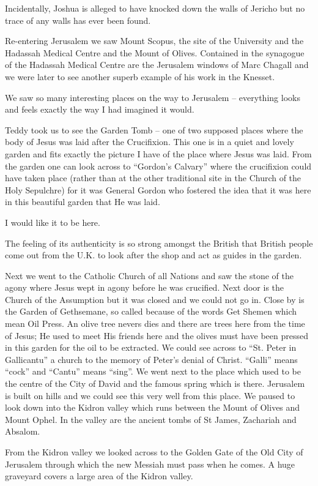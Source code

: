 Incidentally, Joshua is alleged to have knocked down the walls of
Jericho but no trace of any walls has ever been found.

Re-entering Jerusalem we saw Mount Scopus, the site of the University
and the Hadassah Medical Centre and the Mount of Olives. Contained in
the synagogue of the Hadassah Medical Centre are the Jerusalem windows
of Marc Chagall and we were later to see another superb example of his
work in the Knesset.

We saw so many interesting places on the way to Jerusalem --
everything looks and feels exactly the way I had imagined it would.

Teddy took us to see the Garden Tomb -- one of two supposed places
where the body of Jesus was laid after the Crucifixion. This one is in
a quiet and lovely garden and fits exactly the picture I have of the
place where Jesus was laid. From the garden one can look across to
``Gordon's Calvary'' where the crucifixion could have taken place
(rather than at the other traditional site in the Church of the Holy
Sepulchre) for it was General Gordon who fostered the idea that it was
here in this beautiful garden that He was laid.

I would like it to be here.

The feeling of its authenticity is so strong amongst the British that
British people come out from the U.K. to look after the shop and act
as guides in the garden.

Next we went to the Catholic Church of all Nations and saw the stone
of the agony where Jesus wept in agony before he was crucified. Next
door is the Church of the Assumption but it was closed and we could
not go in. Close by is the Garden of Gethsemane, so called because of
the words Get Shemen which mean Oil Press. An olive tree nevers dies
and there are trees here from the time of Jesus; He used to meet His
friends here and the olives must have been pressed in this garden for
the oil to be extracted. We could see across to ``St. Peter in
Gallicantu'' a church to the memory of Peter's denial of
Christ. ``Galli'' means ``cock'' and ``Cantu'' means ``sing''. We went
next to the place which used to be the centre of the City of David and
the famous spring which is there. Jerusalem is built on hills and we
could see this very well from this place. We paused to look down into
the Kidron valley which runs between the Mount of Olives and Mount
Ophel. In the valley are the ancient tombs of St James, Zachariah and
Absalom.

From the Kidron valley we looked across to the Golden Gate of the Old
City of Jerusalem through which the new Messiah must pass when he
comes. A huge graveyard covers a large area of the Kidron valley.

